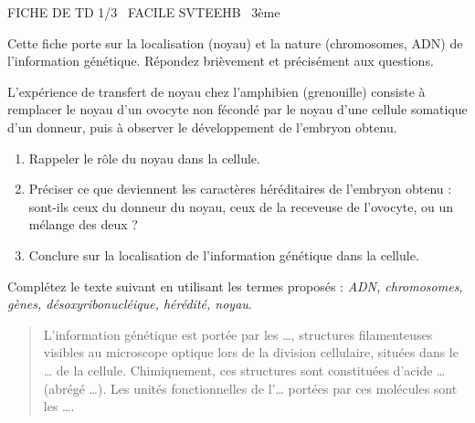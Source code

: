 \documentclass[11pt]{article}
\begin{document}
\begin{tcolorbox}[enhanced,colback=popink,colframe=popink,arc=10pt,boxrule=0pt,left=12pt,right=12pt,top=9pt,bottom=9pt]
{\color{white}\popxbold\small FICHE DE TD 1/3 \textbullet\ FACILE \hfill SVTEEHB \textbullet\ 3ème\par}
\end{tcolorbox}
\vspace{4pt}
\noindent Cette fiche porte sur la localisation (noyau) et la nature (chromosomes, ADN) de l'information génétique. Répondez brièvement et précisément aux questions.

\begin{exercice}
L'expérience de transfert de noyau chez l'amphibien (grenouille) consiste à remplacer le noyau d'un ovocyte non fécondé par le noyau d'une cellule somatique d'un donneur, puis à observer le développement de l'embryon obtenu.
\begin{enumerate}
    \item Rappeler le rôle du noyau dans la cellule.
    \item Préciser ce que deviennent les caractères héréditaires de l'embryon obtenu : sont-ils ceux du donneur du noyau, ceux de la receveuse de l'ovocyte, ou un mélange des deux ?
    \item Conclure sur la localisation de l'information génétique dans la cellule.
\end{enumerate}
\end{exercice}

\begin{exercice}
Complétez le texte suivant en utilisant les termes proposés : \textit{ADN, chromosomes, gènes, désoxyribonucléique, hérédité, noyau}.
\begin{quote}
L'information génétique est portée par les \dots{}, structures filamenteuses visibles au microscope optique lors de la division cellulaire, situées dans le \dots{} de la cellule. Chimiquement, ces structures sont constituées d'acide \dots{} (abrégé \dots{}). Les unités fonctionnelles de l'\dots{} portées par ces molécules sont les \dots{}.
\end{quote}
\end{exercice}
\end{document}
